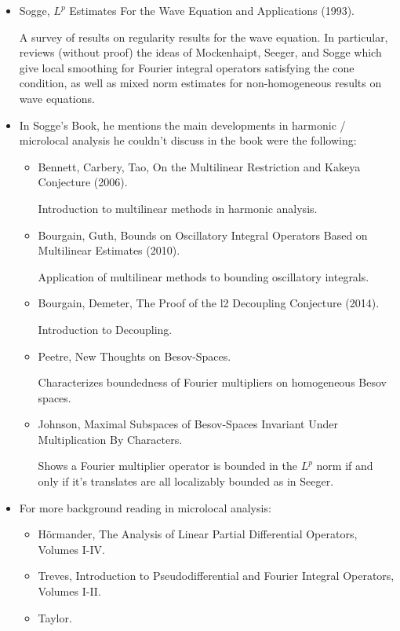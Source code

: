 \begin{itemize}
    \item Sogge, $L^p$ Estimates For the Wave Equation and Applications (1993).

    A survey of results on regularity results for the wave equation. In particular, reviews (without proof) the ideas of Mockenhaipt, Seeger, and Sogge which give local smoothing for Fourier integral operators satisfying the cone condition, as well as mixed norm estimates for non-homogeneous results on wave equations.

    \item In Sogge's Book, he mentions the main developments in harmonic / microlocal analysis he couldn't discuss in the book were the following:
    \begin{itemize}
    \item Bennett, Carbery, Tao, On the Multilinear Restriction and Kakeya Conjecture (2006).

    Introduction to multilinear methods in harmonic analysis.

    \item Bourgain, Guth, Bounds on Oscillatory Integral Operators Based on Multilinear Estimates (2010).

    Application of multilinear methods to bounding oscillatory integrals.

    \item Bourgain, Demeter, The Proof of the l2 Decoupling Conjecture (2014).

    Introduction to Decoupling.

    \item Peetre, New Thoughts on Besov-Spaces.

    Characterizes boundedness of Fourier multipliers on homogeneous Besov spaces.

    \item Johnson, Maximal Subspaces of Besov-Spaces Invariant Under Multiplication By Characters.

    Shows a Fourier multiplier operator is bounded in the $L^p$ norm if and only if it's translates are all localizably bounded as in Seeger.
    \end{itemize}

    \item For more background reading in microlocal analysis:
    \begin{itemize}
        \item H\"{o}rmander, The Analysis of Linear Partial Differential Operators, Volumes I-IV.
        \item Treves, Introduction to Pseudodifferential and Fourier Integral Operators, Volumes I-II.
        \item Taylor.
    \end{itemize}


\end{itemize}
